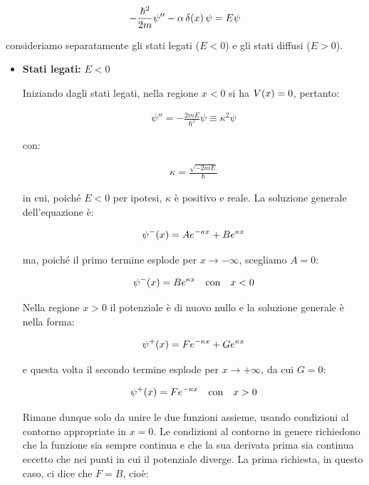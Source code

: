 \begin{align*}
	- \frac{\hbar^2}{2m} \psi'' - \alpha \, \delta\qty(x) \, \psi = E \psi
\end{align*}

	consideriamo separatamente gli stati legati ($E < 0$) e gli stati diffusi ($E > 0$).
	
\begin{itemize}
	\item \textbf{Stati legati:} $E < 0$
	
		Iniziando dagli stati legati, nella regione $x < 0$ si ha $V\qty(x) = 0$, pertanto:
		
	\begin{align*}
		\psi'' = - \frac{2mE}{\hbar^2} \psi \equiv \kappa^2 \psi
	\end{align*}
	
		con:
		
	\begin{align*}
		\kappa = \frac{\sqrt{-2mE}}{\hbar}
	\end{align*}
	
		in cui, poiché $E < 0$ per ipotesi, $\kappa$ è positivo e reale. La soluzione generale dell'equazione è:
		
	\begin{align*}
		\psi^-\qty(x) = A e^{- \kappa x} + B e^{\kappa x}
	\end{align*}
	
		ma, poiché il primo termine esplode per $x \to - \infty$, scegliamo $A	 = 0$:
		
	\begin{align*}
		\psi^-\qty(x) = B e^{\kappa x} \quad \text{con} \quad x < 0
	\end{align*}

		Nella regione $x > 0$ il potenziale è di nuovo nullo e la soluzione generale è nella forma:
		
	\begin{align*}
		\psi^+\qty(x) = F e^{-\kappa x} + G e^{\kappa x} 
	\end{align*}
		
		e questa volta il secondo termine esplode per $x \to + \infty$, da cui $G = 0$:
		
	\begin{align*}
		\psi^+\qty(x) = F e^{-\kappa x} \quad \text{con} \quad x > 0
	\end{align*}
	
		Rimane dunque solo da unire le due funzioni assieme, usando condizioni al contorno appropriate in $x = 0$. Le condizioni al contorno in genere richiedono che la funzione sia sempre continua e che la sua derivata prima sia continua eccetto che nei punti in cui il potenziale diverge. La prima richiesta, in questo caso, ci dice che $F = B$, cioè:
	

\end{itemize}
